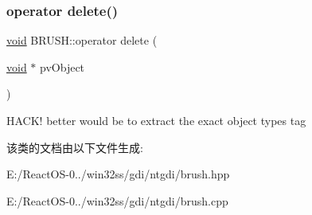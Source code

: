 \subsubsection{\texorpdfstring{operator delete()}{operator delete()}}
{\footnotesize\ttfamily \hyperlink{interfacevoid}{void} B\+R\+U\+S\+H\+::operator delete (\begin{DoxyParamCaption}\item[{\hyperlink{interfacevoid}{void} $\ast$}]{pv\+Object }\end{DoxyParamCaption})\hspace{0.3cm}{\ttfamily [inline]}}

H\+A\+C\+K! better would be to extract the exact object type\textquotesingle{}s tag 

该类的文档由以下文件生成\+:\begin{DoxyCompactItemize}
\item 
E\+:/\+React\+O\+S-\/0../win32ss/gdi/ntgdi/brush.\+hpp\item 
E\+:/\+React\+O\+S-\/0../win32ss/gdi/ntgdi/brush.\+cpp\end{DoxyCompactItemize}
